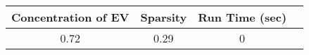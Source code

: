 \begin{tabular}{cccc}
\toprule
 Concentration of EV &  Sparsity & Run Time (sec) \\
\midrule
                0.72 &      0.29 &              0 \\
\bottomrule
\end{tabular}
